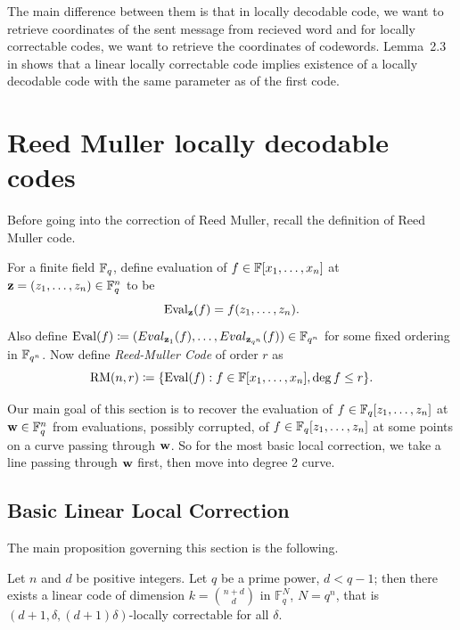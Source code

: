 The main difference between them is that in locally decodable code, we want to retrieve coordinates of the sent message from recieved word and for locally correctable codes, we want to retrieve the coordinates of codewords. Lemma~2.3 in \cite{Yek12} shows that a linear locally correctable code implies existence of a locally decodable code with the same parameter as of the first code.

\section{Reed Muller locally decodable codes}
Before going into the correction of Reed Muller, recall the definition of Reed Muller code.

\begin{definition}%
	For a finite field $\mathbb{F}_q$, define evaluation of $f\in\mathbb{F}[x_1,\ldots,x_n]$ at $\mathbf{z} = (z_1,\ldots,z_n)\in\mathbb{F}_q^n$ to be
	\[
	\mathrm{Eval}_{\mathbf{z}}(f) = f(z_1,\ldots,z_n).
	\]
	Also define $\mathrm{Eval}(f) \coloneqq (Eval_{\mathbf{z}_1}(f), \ldots, Eval_{\mathbf{z}_{q^n}}(f))\in\mathbb{F}_{q^n}$ for some fixed ordering in $\mathbb{F}_{q^n}$.	Now define \emph{Reed-Muller Code} of order $r$ as 
	\[
	\mathrm{RM}(n,r) \coloneqq \{\mathrm{Eval}(f) : f\in\mathbb{F}[x_1,\ldots,x_n], \deg f \leq r \}.
	\]
\end{definition}

Our main goal of this section is to recover the evaluation of $f\in\mathbb{F}_q[z_1,\ldots,z_n]$ at $\mathbf{w}\in\mathbb{F}_q^n$ from evaluations, possibly corrupted, of $f\in\mathbb{F}_q[z_1,\ldots,z_n]$ at some points on a curve passing through $\mathbf{w}$. So for the most basic local correction, we take a line passing through $\mathbf{w}$ first, then move into degree 2 curve.

\subsection{Basic Linear Local Correction}

The main proposition governing this section is the following.
\begin{greybox}
	\begin{proposition}{}{}
		Let $n$ and $d$ be positive integers. Let $q$ be a prime power, $d < q - 1$; then there exists a linear code of dimension $	k = \binom{n+d}{d}$	in $\mathbb{F}_q^N$, $N = q^n$, that is $(d+1, \delta, (d+1)\delta)$-locally correctable for all $\delta$.
	\end{proposition}
\end{greybox}

